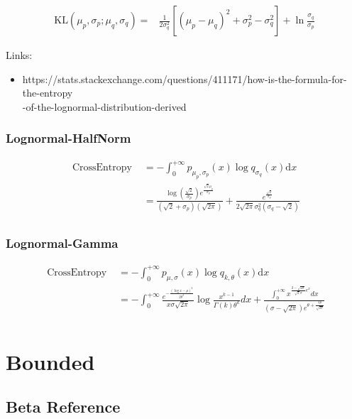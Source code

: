 \documentclass{article}
\begin{document}
$$ \begin{aligned}
\mathrm{KL}\left(\mu_{p}, \sigma_{p} ; \mu_{q}, \sigma_{q}\right)=&\frac{1}{2 \sigma_{q}^{2}}\left[\left(\mu_{p}-\mu_{q}\right)^{2}+\sigma_{p}^{2}-\sigma_{q}^{2}\right]+\ln \frac{\sigma_{q}}{\sigma_{p}}
\end{aligned} $$

Links:
\begin{itemize}
 \item  https://stats.stackexchange.com/questions/411171/how-is-the-formula-for-the-entropy\\-of-the-lognormal-distribution-derived
\end{itemize}

\subsubsection{Lognormal-HalfNorm}

$$ \begin{aligned} \text { CrossEntropy }&=-\int_{0}^{+\infty} p_{\mu_{p},\sigma_{p}}(x) \log q_{\sigma_{q}}(x) \mathrm{d} x \\
&=\frac{\log(\frac{\sqrt{2}}{\sigma_{p}} )e^{\frac{\sqrt{2}\mu_{p}}{\sigma_{p}} }}{(\sqrt{2}+\sigma_{p})(\sqrt{2\pi})}+\frac{e^{\frac{\sqrt2}{\sigma_{q}}}}{2\sqrt{2\pi}\sigma^{2}_{q}(\sigma_{q}-\sqrt{2})} \\
\end{aligned} $$

\subsubsection{Lognormal-Gamma}

$$ \begin{aligned} \text { CrossEntropy }&=-\int_{0}^{+\infty} p_{\mu,\sigma}(x) \log q_{k,\theta}(x) \mathrm{d} x \\
&=-\int_{0}^{+\infty } \frac{e^{-\frac{(\log{x}-\mu)^{2}}{2\theta^{2}} }}{x\sigma\sqrt{2\pi}} \log\frac{x^{k-1}}{\Gamma(k)\theta^{k}}dx+\frac{\int_{0}^{+\infty} x^{\frac{2-\sqrt{2\sigma}}{\sqrt2\sigma}e^{x} }dx }{(\sigma-\sqrt{2\pi})e^{\theta+\frac{2\mu}{\sqrt{2\sigma}}}} \\
\end{aligned} $$

\section{Bounded}

\subsection{Beta Reference}
\end{document}
